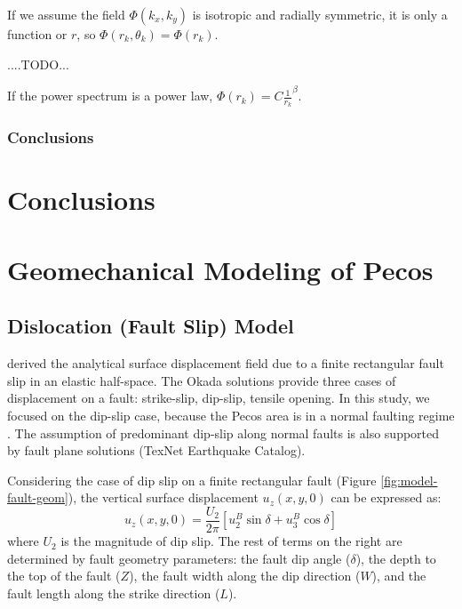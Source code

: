 \documentclass{utexasthesis}
\begin{document}
If we assume the field $\Phi(k_x, k_y)$ is isotropic and radially symmetric, it is only a function or $r$, so $\Phi(r_k, \theta_k) = \Phi(r_k) $.

....TODO...

If the power spectrum is a power law, $\Phi(r_k) = C \frac{1}{r_k}^\beta$. 



\subsection{Conclusions}


\chapter{Conclusions}

\pagebreak




\appendix


\chapter{Geomechanical Modeling of Pecos}


\section{Dislocation (Fault Slip) Model}
\cite{Okada1992InternalDeformationDue} derived the analytical surface displacement field due to a finite rectangular fault slip in an elastic half-space. The Okada solutions provide three cases of displacement on a fault: strike-slip, dip-slip, tensile opening. In this study, we focused on the dip-slip case, because the Pecos area is in a normal faulting regime \cite{LundSnee2018}.  The assumption of predominant dip-slip along normal faults is also supported by fault plane solutions (TexNet Earthquake Catalog). 

Considering the case of dip slip on a finite rectangular fault (Figure \ref{fig:model-fault-geom}), the vertical surface displacement $u_z(x, y, 0)$ can be expressed as:
\begin{equation}
	u_{z}(x,y,0)=\frac{U_{2}}{2\pi }[u_{2}^{B}\sin \delta + u_{3}^{B}\cos \delta]
	\label{eq:okada}
\end{equation}
where $U_2$ is the magnitude of dip slip. The rest of terms on the right are determined by fault geometry parameters: the fault dip angle ($\delta$), the depth to the top of the fault ($Z$), the fault width along the dip direction ($W$), and the fault length along the strike direction ($L$). 
\end{document}
